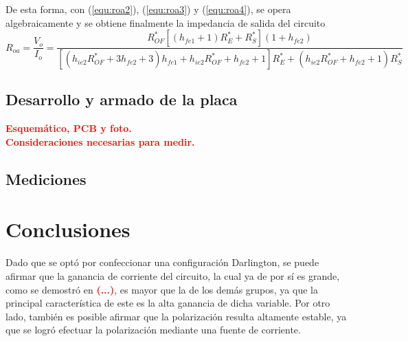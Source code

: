 De esta forma, con (\ref{equ:roa2}), (\ref{equ:roa3}) y (\ref{equ:roa4}), se opera algebraicamente y se obtiene finalmente la impedancia de salida del circuito
\begin{equation}
R_{oa} = \frac{V_o}{I_o} = 
\frac {R_{OF}^* \left[ \left( h_{fe1} + 1 \right) R_{E}^* + R_{S}^* \right] \left( 1 + h_{fe2} \right) }{ \left[ \left( h_{ie2} R_{OF}^* + 3 h_{fe2} + 3 \right) h_{fe1} + h_{ie2} R_{OF}^* + h_{fe2} + 1 \right] R_{E}^* + \left( h_{ie2} R_{OF}^* + h_{fe2} + 1 \right) R_{S}^* }
\end{equation}

\subsection{Desarrollo y armado de la placa}
\begin{center}
	\LARGE{\textcolor{red}{\textbf{Esquemático, PCB y foto.}}}\\
	\LARGE{\textcolor{red}{\textbf{Consideraciones necesarias para medir.}}}
\end{center}

\subsection{Mediciones}

\section{Conclusiones}
Dado que se optó por confeccionar una configuración Darlington, se puede afirmar que la ganancia de corriente del circuito, la cual ya de por sí es grande, como se demostró en \textcolor{red}{\textbf{(...)}}, es mayor que la de los demás grupos, ya que la principal característica de este es la alta ganancia de dicha variable. Por otro lado, también es posible afirmar que la polarización resulta altamente estable, ya que se logró efectuar la polarización mediante una fuente de corriente.
	
